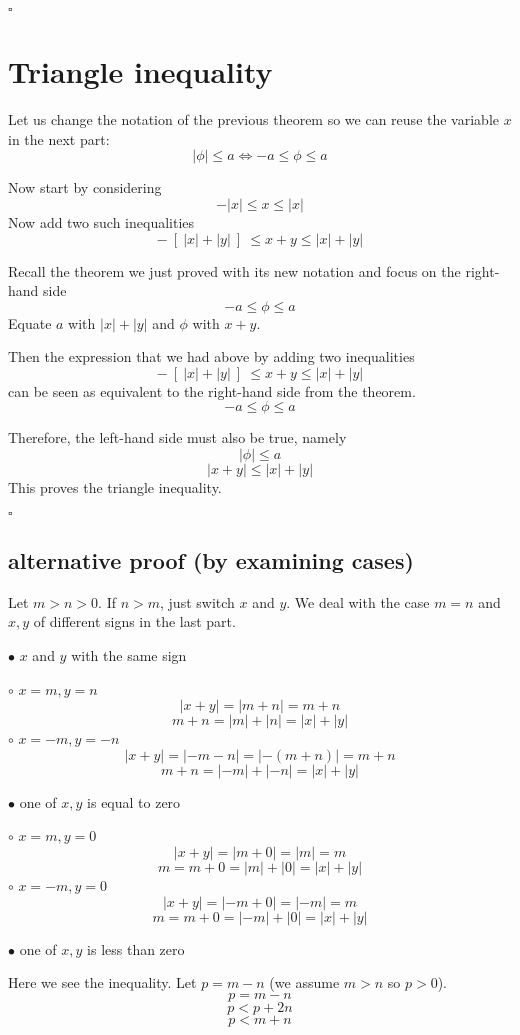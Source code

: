 \documentclass[11pt, oneside]{article}
\begin{document}
$\square$

\section*{Triangle inequality}

Let us change the notation of the previous theorem so we can reuse the variable $x$ in the next part:
\[ | \phi | \le a \iff -a \le \phi \le a \]

Now start by considering
\[ - |x| \le x \le |x| \]
Now add two such inequalities 
\[ - \ [ \ |x| +  |y| \ ] \  \le x + y \le  |x| + |y|  \]

Recall the theorem we just proved with its new notation and focus on the right-hand side
\[  -a \le \phi \le a \]
Equate $a$ with $|x| + |y|$ and $\phi$ with $x + y$.  

Then the expression that we had above by adding two inequalities
\[ - \ [ \ |x| +  |y| \ ] \  \le x + y \le  |x| + |y|  \]
can be seen as equivalent to the right-hand side from the theorem.  
\[  -a \le \phi \le a \]

Therefore, the left-hand side must also be true, namely
\[ |\phi| \le a \]
\[ |x + y| \le  |x| +  |y| \]
This proves the triangle inequality.

$\square$

\subsection*{alternative proof (by examining cases)}

Let $m > n > 0$.  If $n > m$, just switch $x$ and $y$.  We deal with the case $m=n$ and $x,y$ of different signs in the last part.

$\bullet$  $x$ and $y$ with the same sign

$\circ$  $x = m, y = n$
\[ |x + y| = |m + n| = m + n \]
\[ m + n = |m| + |n| = |x| + |y| \]
$\circ$  $x = -m, y = -n$
\[ |x + y| = |-m - n| = |-(m + n)| = m + n \]
\[ m + n = |-m| + |-n| = |x| + |y| \]

$\bullet$  one of $x,y$ is equal to zero

$\circ$  $x = m, y = 0$
\[ |x + y| = |m + 0| = |m| = m \]
\[ m = m + 0 = |m| + |0| = |x| + |y| \]
$\circ$  $x = -m, y = 0$
\[ |x + y| = |-m + 0| = |-m| = m \]
\[ m = m + 0 = |-m| + |0| = |x| + |y| \]

$\bullet$  one of $x,y$ is less than zero

Here we see the inequality.  Let $p = m - n$ (we assume $m > n$ so $p > 0$).
\[ p = m - n \]
\[ p < p + 2n \]
\[ p < m + n \]
\end{document}
